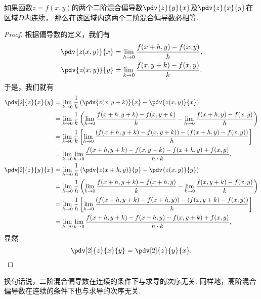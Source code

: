 \begin{theorem}
如果函数\(z=f(x,y)\)的两个二阶混合偏导数\(\pdv{z}{y}{x}\)及\(\pdv{z}{x}{y}\)在区域\(D\)内连续，
那么在该区域内这两个二阶混合偏导数必相等.
\begin{proof}
根据偏导数的定义，我们有\begin{gather*}
	\pdv{z(x,y)}{x}
	= \lim_{h\to0} \frac{f(x+h,y)-f(x,y)}{h}, \\
	\pdv{z(x,y)}{y}
	= \lim_{k\to0} \frac{f(x,y+k)-f(x,y)}{k}.
\end{gather*}
于是，我们就有\begin{align*}
	\pdv[2]{z}{x}{y}
	&= \lim_{k\to0}
		\frac1k \left( \pdv{z(x,y+k)}{x} - \pdv{z(x,y)}{x} \right) \\
	&= \lim_{k\to0}
		\frac1k \left( \lim_{h\to0} \frac{f(x+h,y+k)-f(x,y+k)}{h} - \lim_{h\to0} \frac{f(x+h,y)-f(x,y)}{h} \right) \\
	&= \lim_{k\to0}
		\frac1k \left[ \lim_{h\to0} \frac{(f(x+h,y+k)-f(x,y+k))-(f(x+h,y)-f(x,y))}{h} \right] \\
	&= \lim_{k\to0} \lim_{h\to0}
		\frac{f(x+h,y+k)-f(x,y+k)-f(x+h,y)+f(x,y)}{h \cdot k}, \\
	\pdv[2]{z}{y}{x}
	&= \lim_{h\to0}
		\frac1h \left( \pdv{z(x+h,y)}{y} - \pdv{z(x,y)}{y} \right) \\
	&= \lim_{h\to0}
		\frac1h \left( \lim_{k\to0} \frac{f(x+h,y+k)-f(x+h,y)}{k} - \lim_{k\to0} \frac{f(x,y+k)-f(x,y)}{k} \right) \\
	&= \lim_{h\to0}
		\frac1h \left[ \lim_{k\to0} \frac{(f(x+h,y+k)-f(x+h,y))-(f(x,y+k)-f(x,y))}{k} \right] \\
	&= \lim_{h\to0} \lim_{k\to0}
		\frac{f(x+h,y+k)-f(x+h,y)-f(x,y+k)+f(x,y)}{h \cdot k}, \\
\end{align*}
显然\begin{equation*}
	\pdv[2]{z}{x}{y} = \pdv[2]{z}{y}{x}.
	\qedhere
\end{equation*}
\end{proof}
\end{theorem}
换句话说，二阶混合偏导数在连续的条件下与求导的次序无关.
同样地，高阶混合偏导数在连续的条件下也与求导的次序无关.

